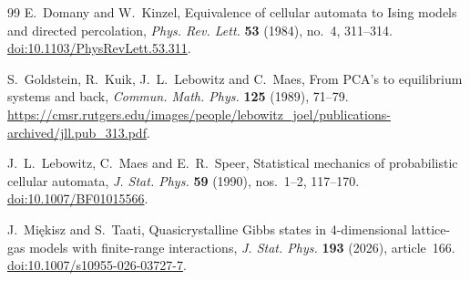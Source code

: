 \begin{thebibliography}{99}
E.~Domany and W.~Kinzel,
Equivalence of cellular automata to Ising models and directed percolation,
\emph{Phys. Rev. Lett.} \textbf{53} (1984), no.~4, 311--314.
\href{https://doi.org/10.1103/PhysRevLett.53.311}{doi:10.1103/PhysRevLett.53.311}.

S.~Goldstein, R.~Kuik, J.~L.~Lebowitz and C.~Maes,
From PCA's to equilibrium systems and back,
\emph{Commun. Math. Phys.} \textbf{125} (1989), 71--79.
\url{https://cmsr.rutgers.edu/images/people/lebowitz_joel/publications-archived/jll.pub_313.pdf}.

J.~L.~Lebowitz, C.~Maes and E.~R.~Speer,
Statistical mechanics of probabilistic cellular automata,
\emph{J. Stat. Phys.} \textbf{59} (1990), nos.~1--2, 117--170.
\href{https://doi.org/10.1007/BF01015566}{doi:10.1007/BF01015566}.

J.~Mi\k{e}kisz and S.~Taati,
Quasicrystalline Gibbs states in 4-dimensional lattice-gas models
with finite-range interactions,
\emph{J. Stat. Phys.} \textbf{193} (2026), article~166.
\href{https://doi.org/10.1007/s10955-026-03727-7}{doi:10.1007/s10955-026-03727-7}.

\end{thebibliography}
